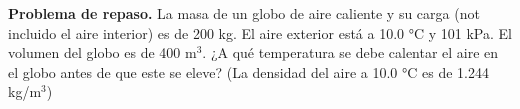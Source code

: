 \item \textbf{Problema de repaso.} La masa de un globo de aire caliente y su carga (not incluido el aire interior) es de 200 kg. El aire exterior está a 10.0 °C y 101 kPa. El volumen del globo es de 400 m$^3$. ¿A qué temperatura se debe calentar el aire en el globo antes de que este se eleve? (La densidad del aire a 10.0 °C es de 1.244 kg/m$^3$)
